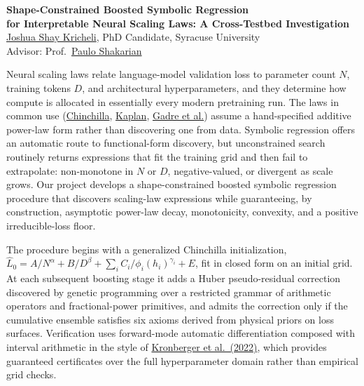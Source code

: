 \documentclass[10pt]{article}
\begin{document}
\begin{center}
    {\large\bfseries Shape-Constrained Boosted Symbolic Regression \\
    for Interpretable Neural Scaling Laws: A Cross-Testbed Investigation} \\[4pt]
    {\normalsize \href{https://krichelj.github.io/}{Joshua Shay Kricheli}, PhD Candidate, Syracuse University \\
    Advisor: Prof.\ \href{https://ecs.syracuse.edu/faculty-staff/paulo-shakarian}{Paulo Shakarian}}
\end{center}

Neural scaling laws relate language-model validation loss to parameter count $N$, training tokens $D$, and architectural hyperparameters, and they determine how compute is allocated in essentially every modern pretraining run. The laws in common use (\href{https://arxiv.org/abs/2203.15556}{Chinchilla}, \href{https://arxiv.org/abs/2001.08361}{Kaplan}, \href{https://arxiv.org/abs/2403.08540}{Gadre et al.}) assume a hand-specified additive power-law form rather than discovering one from data. Symbolic regression offers an automatic route to functional-form discovery, but unconstrained search routinely returns expressions that fit the training grid and then fail to extrapolate: non-monotone in $N$ or $D$, negative-valued, or divergent as scale grows. Our project develops a shape-constrained boosted symbolic regression procedure that discovers scaling-law expressions while guaranteeing, by construction, asymptotic power-law decay, monotonicity, convexity, and a positive irreducible-loss floor.

The procedure begins with a generalized Chinchilla initialization, $\hat{L}_0 = A/N^{\alpha} + B/D^{\beta} + \sum_i C_i/\phi_i(h_i)^{\gamma_i} + E$, fit in closed form on an initial grid. At each subsequent boosting stage it adds a Huber pseudo-residual correction discovered by genetic programming over a restricted grammar of arithmetic operators and fractional-power primitives, and admits the correction only if the cumulative ensemble satisfies six axioms derived from physical priors on loss surfaces. Verification uses forward-mode automatic differentiation composed with interval arithmetic in the style of \href{https://doi.org/10.1162/evco_a_00294}{Kronberger et al.\ (2022)}, which provides guaranteed certificates over the full hyperparameter domain rather than empirical grid checks.
\end{document}
